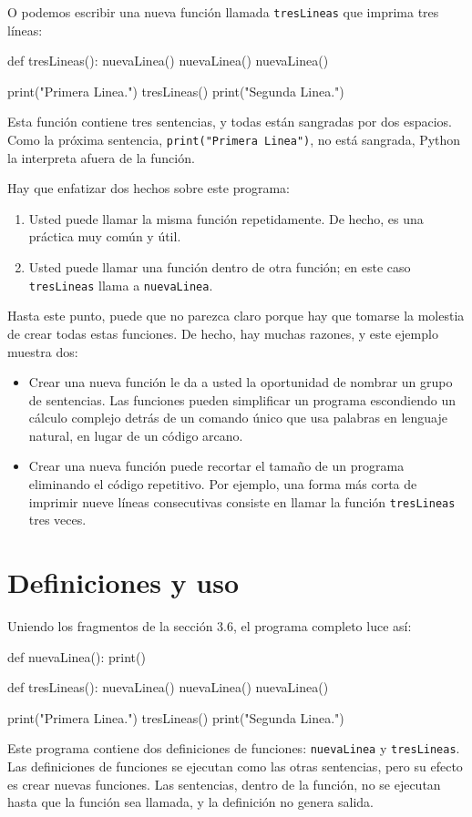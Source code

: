 O podemos escribir una nueva función llamada \texttt{tresLineas} que
imprima tres líneas:

\begin{pythoncode}
def tresLineas():
  nuevaLinea()
  nuevaLinea()
  nuevaLinea()

print("Primera Linea.")
tresLineas()
print("Segunda Linea.")
\end{pythoncode}
 Esta función contiene tres sentencias, y todas están sangradas por
dos espacios. Como la próxima sentencia, \texttt{print("Primera Linea")},
no está sangrada, Python la interpreta afuera de la función.

Hay que enfatizar dos hechos sobre este programa:
\begin{enumerate}
\item Usted puede llamar la misma función repetidamente. De hecho, es una
práctica muy común y útil.
\item Usted puede llamar una función dentro de otra función; en este caso
\texttt{tresLineas} llama a \texttt{nuevaLinea}.
\end{enumerate}
Hasta este punto, puede que no parezca claro porque hay que tomarse
la molestia de crear todas estas funciones. De hecho, hay muchas razones,
y este ejemplo muestra dos:
\begin{itemize}
\item Crear una nueva función le da a usted la oportunidad de nombrar un
grupo de sentencias. Las funciones pueden simplificar un programa
escondiendo un cálculo complejo detrás de un comando único que usa
palabras en lenguaje natural, en lugar de un código arcano.
\item Crear una nueva función puede recortar el tamaño de un programa eliminando
el código repetitivo. Por ejemplo, una forma más corta de imprimir
nueve líneas consecutivas consiste en llamar la función \texttt{tresLineas}
tres veces.
\end{itemize}

\section{Definiciones y uso}

Uniendo los fragmentos de la sección 3.6, el programa completo luce
así:

\begin{pythoncode}
def nuevaLinea():
  print()

def tresLineas():
  nuevaLinea()
  nuevaLinea()
  nuevaLinea()

print("Primera Linea.")
tresLineas()
print("Segunda Linea.")
\end{pythoncode}
 Este programa contiene dos definiciones de funciones: \texttt{nuevaLinea}
y \texttt{tresLineas}. Las definiciones de funciones se ejecutan como
las otras sentencias, pero su efecto es crear nuevas funciones. Las
sentencias, dentro de la función, no se ejecutan hasta que la función
sea llamada, y la definición no genera salida.

